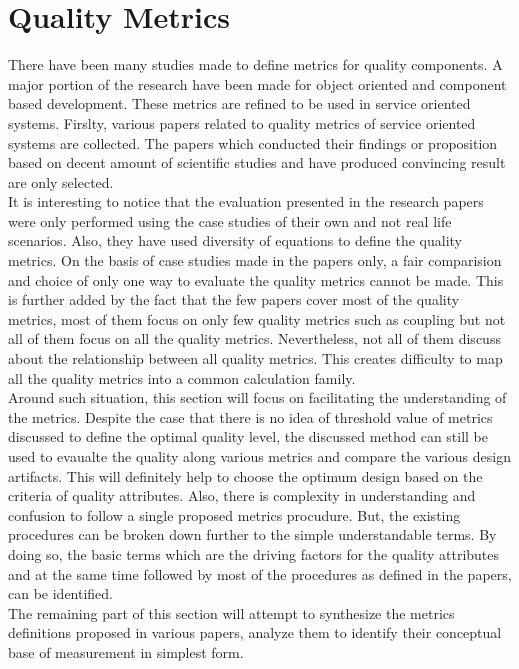 \section{Quality Metrics}\label{section:quality_of_service/quality_metrics}
There have been many studies made to define metrics for quality components. A major portion of the research have been made for object oriented and component based development. These metrics are refined to be used in service oriented systems.\cite{Xiao-jun:2015aa, Sindhgatta:2015aa} Firslty, various papers related to quality metrics of service oriented systems are collected. The papers which conducted their findings or proposition based on decent amount of scientific studies and have produced convincing result are only selected.\\
It is interesting to notice that the evaluation presented in the research papers were only performed using the case studies of their own and not real life scenarios. Also, they have used diversity of equations to define the quality metrics. On the basis of case studies made in the papers only, a fair comparision and choice of only one way to evaluate the quality metrics cannot be made. This is further added by the fact that the few papers cover most of the quality metrics, most of them focus on only few quality metrics such as coupling but not all of them focus on all the quality metrics. Nevertheless, not all of them discuss about the relationship between all quality metrics. \cite{Elhag:2014aa} This creates difficulty to map all the quality metrics into a common calculation family. 
\\
Around such situation, this section will focus on facilitating the understanding of the metrics. Despite the case that there is no idea of threshold value of metrics discussed to define the optimal quality level, the discussed method can still be used to evaualte the quality along various metrics and compare the various design artifacts. This will definitely help to choose the optimum design based on the criteria of quality attributes. Also, there is complexity in understanding and confusion to follow a single proposed metrics procudure. But, the existing procedures can be broken down further to the simple understandable terms. By doing so, the basic terms which are the driving factors for the quality attributes and at the same time followed by most of the procedures as defined in the papers, can be identified.
\\
The remaining part of this section will attempt to synthesize the metrics definitions proposed in various papers, analyze them to identify their conceptual base of measurement in simplest form.

